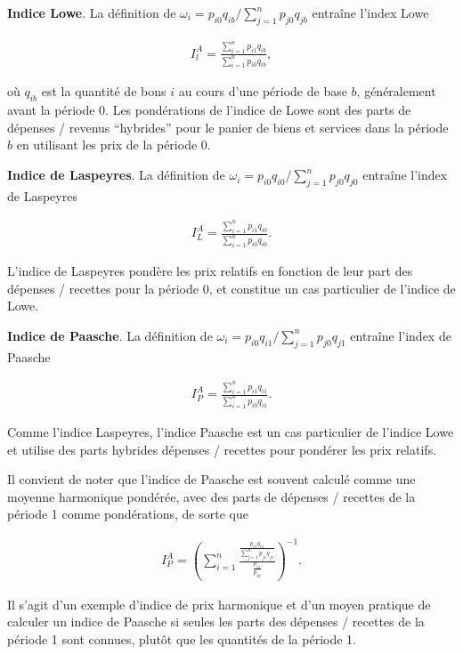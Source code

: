 \documentclass[]{article}
\begin{document}
\textbf{Indice Lowe}. La définition de \(\omega_{i} = p_{i0} q_{ib} / \sum_{j = 1}^{n} p_{j0} q_{jb}\) entraîne l'index Lowe

\begin{align*}
I^{A}_{l} = \frac{\sum_{i = 1}^{n} p_{i1} q_{ib}}{\sum_{i = 1}^{n} p_{i0} q_{ib}},
\end{align*}

où \(q_{ib}\) est la quantité de bons \(i\) au cours d'une période de base \(b\), généralement avant la période 0. Les pondérations de l'indice de Lowe sont des parts de dépenses / revenus ``hybrides'' pour le panier de biens et services dans la période \(b\) en utilisant les prix de la période 0.

\textbf{Indice de Laspeyres}. La définition de \(\omega_{i} = p_{i0} q_{i0} / \sum_{j = 1}^{n} p_{j0} q_{j0}\) entraîne l'index de Laspeyres

\begin{align*}
I^{A}_{L} = \frac{\sum_{i = 1}^{n} p_{i1} q_{i0}}{\sum_{i = 1}^{n} p_{i0} q_{i0}}.
\end{align*}

L'indice de Laspeyres pondère les prix relatifs en fonction de leur part des dépenses / recettes pour la période 0, et constitue un cas particulier de l'indice de Lowe.

\textbf{Indice de Paasche}. La définition de \(\omega_{i} = p_{i0} q_{i1} / \sum_{j = 1}^{n} p_{j0} q_{j1}\) entraîne l'index de Paasche

\begin{align*}
I^{A}_{P} = \frac{\sum_{i = 1}^{n} p_{i1} q_{i1}}{\sum_{i = 1}^{n} p_{i0} q_{i1}}.
\end{align*}

Comme l'indice Laspeyres, l'indice Paasche est un cas particulier de l'indice Lowe et utilise des parts hybrides dépenses / recettes pour pondérer les prix relatifs.

Il convient de noter que l'indice de Paasche est souvent calculé comme une moyenne harmonique pondérée, avec des parts de dépenses / recettes de la période 1 comme pondérations, de sorte que

\begin{align*}
I^{A}_{P} = \left (\sum_{i = 1}^{n} \frac{\frac{p_{i1} q_{i1}}{\sum_{j = 1}^{n} p_{j1} q_{j1}}}{\frac{p_{i1}}{p_{i0}}} \right)^{- 1}.
\end{align*}

Il s'agit d'un exemple d'indice de prix harmonique et d'un moyen pratique de calculer un indice de Paasche si seules les parts des dépenses / recettes de la période 1 sont connues, plutôt que les quantités de la période 1.
\end{document}
